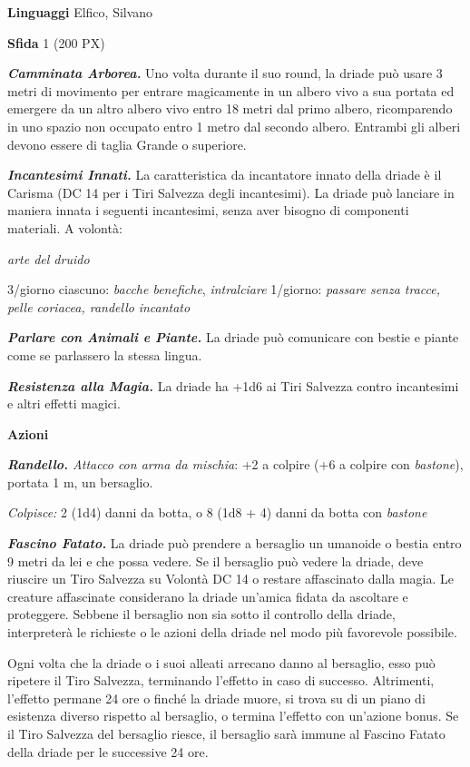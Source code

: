 \begin{multicols}{2}
\textbf{Linguaggi} Elfico, Silvano

\textbf{Sfida} 1 (200 PX)

\textit{\textbf{Camminata Arborea.}} Uno volta durante il suo round, la driade può usare 3 metri di movimento per entrare magicamente in un albero vivo a sua portata ed emergere da un altro albero vivo entro 18 metri dal primo albero, ricomparendo in uno spazio non occupato entro 1 metro dal secondo albero. Entrambi gli alberi devono essere di taglia Grande o superiore.

\textit{\textbf{Incantesimi Innati.}} La caratteristica da incantatore innato della driade è il Carisma (DC 14 per i Tiri Salvezza degli incantesimi). La driade può lanciare in maniera innata i seguenti incantesimi, senza aver bisogno di componenti materiali. A volontà:

\textit{arte del druido}

3/giorno ciascuno: \textit{bacche benefiche}, \textit{intralciare} 1/giorno:
\textit{passare senza tracce, pelle coriacea, randello} \textit{incantato}

\textit{\textbf{Parlare con Animali e Piante.}} La driade può comunicare con bestie e piante come se parlassero la stessa lingua.

\textit{\textbf{Resistenza alla Magia.}} La driade ha +1d6 ai Tiri Salvezza contro incantesimi e altri effetti magici.

\textbf{Azioni}

\textit{\textbf{Randello.} Attacco con arma da mischia}: +2 a colpire (+6 a colpire con \textit{bastone}), portata 1 m, un bersaglio.

\textit{Colpisce:} 2 (1d4) danni da botta, o 8 (1d8 + 4) danni da botta con \textit{bastone}

\textit{\textbf{Fascino Fatato.}} La driade può prendere a bersaglio un umanoide o bestia entro 9 metri da lei e che possa vedere. Se il bersaglio può vedere la driade, deve riuscire un Tiro Salvezza su Volontà DC 14 o restare affascinato dalla magia. Le creature affascinate considerano la driade un'amica fidata da ascoltare e proteggere. Sebbene il bersaglio non sia sotto il controllo della driade, interpreterà le richieste o le azioni della driade nel modo più favorevole possibile.

Ogni volta che la driade o i suoi alleati arrecano danno al bersaglio, esso può ripetere il Tiro Salvezza, terminando l'effetto in caso di successo. Altrimenti, l'effetto permane 24 ore o finché la driade muore, si trova su di un piano di esistenza diverso rispetto al bersaglio, o termina l'effetto con un'azione bonus. Se il Tiro Salvezza del bersaglio riesce, il bersaglio sarà immune al Fascino Fatato della driade per le successive 24 ore.


\end{multicols}
